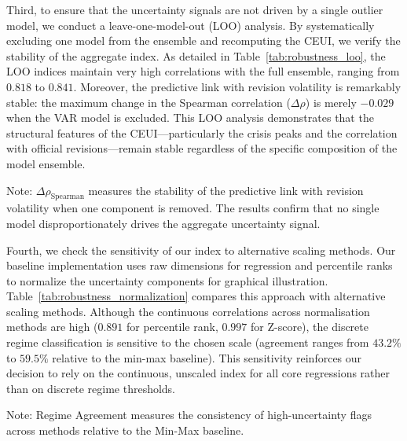 \documentclass[12pt,a4paper]{article}
\theoremstyle{remark}
\begin{document}
Third, to ensure that the uncertainty signals are not driven by a single outlier model, we conduct a leave-one-model-out (LOO) analysis. By systematically excluding one model from the ensemble and recomputing the CEUI, we verify the stability of the aggregate index. As detailed in Table~\ref{tab:robustness_loo}, the LOO indices maintain very high correlations with the full ensemble, ranging from $0.818$ to $0.841$. Moreover, the predictive link with revision volatility is remarkably stable: the maximum change in the Spearman correlation ($\Delta\rho$) is merely $-0.029$ when the VAR model is excluded. This LOO analysis demonstrates that the structural features of the CEUI---particularly the crisis peaks and the correlation with official revisions---remain stable regardless of the specific composition of the model ensemble.

\begin{table}[ht]
\centering
\begin{threeparttable}
\caption{Leave-One-Model-Out (LOO) Ensemble Stability}
\label{tab:robustness_loo}

\begin{tablenotes}
  \small \item Note: $\Delta\rho_{\text{Spearman}}$ measures the stability of the predictive link with revision volatility when one component is removed. The results confirm that no single model disproportionately drives the aggregate uncertainty signal.
\end{tablenotes}
\end{threeparttable}
\end{table}

Fourth, we check the sensitivity of our index to alternative scaling methods. Our baseline implementation uses raw dimensions for regression and percentile ranks to normalize the uncertainty components for graphical illustration. Table~\ref{tab:robustness_normalization} compares this approach with alternative scaling methods. Although the continuous correlations across normalisation methods are high ($0.891$ for percentile rank, $0.997$ for Z-score), the discrete regime classification is sensitive to the chosen scale (agreement ranges from $43.2\%$ to $59.5\%$ relative to the min-max baseline). This sensitivity reinforces our decision to rely on the continuous, unscaled index for all core regressions rather than on discrete regime thresholds.

\begin{table}[ht]
\centering
\begin{threeparttable}
\caption{Sensitivity to Normalization Methods}
\label{tab:robustness_normalization}

\begin{tablenotes}
  \small \item Note: Regime Agreement measures the consistency of high-uncertainty flags across methods relative to the Min-Max baseline.
\end{tablenotes}
\end{threeparttable}
\end{table}
\end{document}
